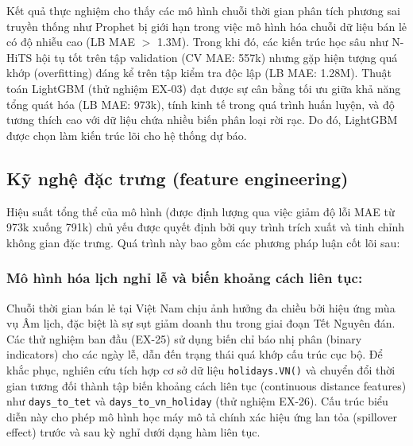 \documentclass{article}
\begin{document}
Kết quả thực nghiệm cho thấy các mô hình chuỗi thời gian phân tích phương sai truyền thống như Prophet bị giới hạn trong việc mô hình hóa chuỗi dữ liệu bán lẻ có độ nhiễu cao (LB MAE $>$ 1.3M). Trong khi đó, các kiến trúc học sâu như N-HiTS hội tụ tốt trên tập validation (CV MAE: 557k) nhưng gặp hiện tượng quá khớp (overfitting) đáng kể trên tập kiểm tra độc lập (LB MAE: 1.28M). Thuật toán LightGBM (thử nghiệm EX-03) đạt được sự cân bằng tối ưu giữa khả năng tổng quát hóa (LB MAE: 973k), tính kinh tế trong quá trình huấn luyện, và độ tương thích cao với dữ liệu chứa nhiều biến phân loại rời rạc. Do đó, LightGBM được chọn làm kiến trúc lõi cho hệ thống dự báo.

\subsection{Kỹ nghệ đặc trưng (feature engineering)}
Hiệu suất tổng thể của mô hình (được định lượng qua việc giảm độ lỗi MAE từ 973k xuống 791k) chủ yếu được quyết định bởi quy trình trích xuất và tinh chỉnh không gian đặc trưng. Quá trình này bao gồm các phương pháp luận cốt lõi sau:

\subsubsection{Mô hình hóa lịch nghỉ lễ và biến khoảng cách liên tục:}
Chuỗi thời gian bán lẻ tại Việt Nam chịu ảnh hưởng đa chiều bởi hiệu ứng mùa vụ Âm lịch, đặc biệt là sự sụt giảm doanh thu trong giai đoạn Tết Nguyên đán. Các thử nghiệm ban đầu (EX-25) sử dụng biến chỉ báo nhị phân (binary indicators) cho các ngày lễ, dẫn đến trạng thái quá khớp cấu trúc cục bộ. Để khắc phục, nghiên cứu tích hợp cơ sở dữ liệu \texttt{holidays.VN()} và chuyển đổi thời gian tương đối thành tập biến khoảng cách liên tục (continuous distance features) như \texttt{days\_to\_tet} và \texttt{days\_to\_vn\_holiday} (thử nghiệm EX-26). Cấu trúc biểu diễn này cho phép mô hình học máy mô tả chính xác hiệu ứng lan tỏa (spillover effect) trước và sau kỳ nghỉ dưới dạng hàm liên tục.
\end{document}
